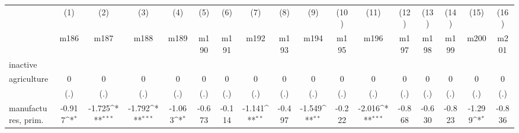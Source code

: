 {
\def\sym#1{\ifmmode^{#1}\else\(^{#1}\)\fi}
\begin{tabular}{l*{16}{c}}
\hline\hline
                    &\multicolumn{1}{c}{(1)}&\multicolumn{1}{c}{(2)}&\multicolumn{1}{c}{(3)}&\multicolumn{1}{c}{(4)}&\multicolumn{1}{c}{(5)}&\multicolumn{1}{c}{(6)}&\multicolumn{1}{c}{(7)}&\multicolumn{1}{c}{(8)}&\multicolumn{1}{c}{(9)}&\multicolumn{1}{c}{(10)}&\multicolumn{1}{c}{(11)}&\multicolumn{1}{c}{(12)}&\multicolumn{1}{c}{(13)}&\multicolumn{1}{c}{(14)}&\multicolumn{1}{c}{(15)}&\multicolumn{1}{c}{(16)}\\
                    &\multicolumn{1}{c}{m186}&\multicolumn{1}{c}{m187}&\multicolumn{1}{c}{m188}&\multicolumn{1}{c}{m189}&\multicolumn{1}{c}{m190}&\multicolumn{1}{c}{m191}&\multicolumn{1}{c}{m192}&\multicolumn{1}{c}{m193}&\multicolumn{1}{c}{m194}&\multicolumn{1}{c}{m195}&\multicolumn{1}{c}{m196}&\multicolumn{1}{c}{m197}&\multicolumn{1}{c}{m198}&\multicolumn{1}{c}{m199}&\multicolumn{1}{c}{m200}&\multicolumn{1}{c}{m201}\\
\hline
inactive            &                     &                     &                     &                     &                     &                     &                     &                     &                     &                     &                     &                     &                     &                     &                     &                     \\
agriculture         &           0         &           0         &           0         &           0         &           0         &           0         &           0         &           0         &           0         &           0         &           0         &           0         &           0         &           0         &           0         &           0         \\
                    &         (.)         &         (.)         &         (.)         &         (.)         &         (.)         &         (.)         &         (.)         &         (.)         &         (.)         &         (.)         &         (.)         &         (.)         &         (.)         &         (.)         &         (.)         &         (.)         \\
[1em]
manufactures, prim. &      -0.917\sym{*}  &      -1.725\sym{***}&      -1.792\sym{***}&      -1.063\sym{*}  &      -0.673         &      -0.114         &      -1.141\sym{**} &      -0.497         &      -1.549\sym{**} &      -0.222         &      -2.016\sym{***}&      -0.868         &      -0.630         &      -0.823         &      -1.299\sym{*}  &      -0.836         \\

\end{tabular}}
